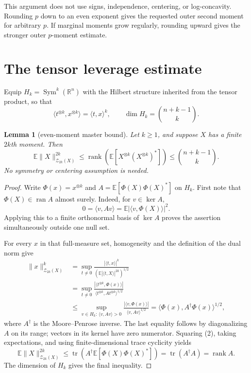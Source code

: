 \documentclass[10pt]{article}
\newtheorem{lemma}{Lemma}
\newcommand{\R}{\mathbb R}
\newcommand{\E}{\mathbb E}
\newcommand{\Zp}{\mathcal Z}
\begin{document}
This argument does not use signs, independence, centering, or log-concavity.
Rounding $p$ down to an even exponent gives the requested outer second moment
for arbitrary $p$.  If marginal moments grow regularly, rounding upward gives
the stronger outer $p$-moment estimate.

\section{The tensor leverage estimate}
Equip $H_k=\operatorname{Sym}^k(\R^n)$ with the Hilbert structure inherited
from the tensor product, so that
\[
 \langle t^{\otimes k},x^{\otimes k}\rangle=\langle t,x\rangle^k,
 \qquad \dim H_k=\binom{n+k-1}{k}.
\]

\begin{lemma}[even-moment master bound]\label{lem:master}
Let $k\ge1$, and suppose $X$ has a finite $2k$th moment.  Then
\[
 \E\|X\|_{\Zp_{2k}(X)}^{2k}
 \le \operatorname{rank}\!\left(
 \E[X^{\otimes k}(X^{\otimes k})^*]\right)
 \le \binom{n+k-1}{k}.                                      \tag{1}
\]
No symmetry or centering assumption is needed.
\end{lemma}

\begin{proof}
Write $\Phi(x)=x^{\otimes k}$ and
$A=\E[\Phi(X)\Phi(X)^*]$ on $H_k$.  First note that
$\Phi(X)\in\operatorname{ran}A$ almost surely.  Indeed, for $v\in\ker A$,
\[
 0=\langle v,Av\rangle=\E|\langle v,\Phi(X)\rangle|^2.
\]
Applying this to a finite orthonormal basis of $\ker A$ proves the assertion
simultaneously outside one null set.

For every $x$ in that full-measure set, homogeneity and the definition of the
dual norm give
\begin{align*}
 \|x\|_{\Zp_{2k}(X)}^k
 &=\sup_{t\ne0}
 \frac{|\langle t,x\rangle|^k}
 {(\E|\langle t,X\rangle|^{2k})^{1/2}}\\
 &=\sup_{t\ne0}
 \frac{|\langle t^{\otimes k},\Phi(x)\rangle|}
 {\langle t^{\otimes k},A t^{\otimes k}\rangle^{1/2}}\\
 &\le \sup_{v\in H_k:\,\langle v,Av\rangle>0}
 \frac{|\langle v,\Phi(x)\rangle|}{\langle v,Av\rangle^{1/2}}
 =\langle\Phi(x),A^\dagger\Phi(x)\rangle^{1/2},             \tag{2}
\end{align*}
where $A^\dagger$ is the Moore--Penrose inverse.  The last equality follows
by diagonalizing $A$ on its range; vectors in its kernel have zero numerator.
Squaring (2), taking expectations, and using finite-dimensional trace
cyclicity yields
\[
 \E\|X\|_{\Zp_{2k}(X)}^{2k}
 \le \operatorname{tr}\!\left(A^\dagger
       \E[\Phi(X)\Phi(X)^*]\right)
 =\operatorname{tr}(A^\dagger A)=\operatorname{rank}A.
\]
The dimension of $H_k$ gives the final inequality.
\end{proof}
\end{document}
